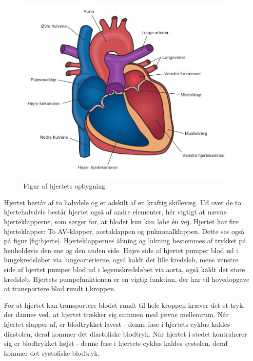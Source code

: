 \begin{figure}[h!]
	\centering
	\includegraphics[width=0.5\linewidth]{Teori/Fysiologi/hjerte}
	\caption{Figur af hjertets opbygning \cite{Hjerte}}
	\label{fig:hjerte}
\end{figure}

Hjertet består af to halvdele og er adskilt af en kraftig skillevæg. Ud over de to hjertehalvdele
består hjertet også af andre elementer, hér vigtigt at nævne hjerteklapperne, som sørger for,
at blodet kun kan løbe én vej. Hjertet har fire hjerteklapper: To AV-klapper, aortaklappen og
pulmonalklappen. Dette ses også på figur \vref{fig:hjerte}. Hjerteklappernes åbning og lukning bestemmes af trykket på henholdsvis den ene og den anden side. Højre side af hjertet pumper blod ud i lungekredsløbet via lungearterierne, også kaldt det lille kredsløb, mens venstre side af hjertet pumper blod ud i legemskredsløbet via aorta, også kaldt det store kredsløb. Hjertets pumpefunktionen er en vigtig funktion, der har til hovedopgave at transportere blod rundt i kroppen.

For at hjertet kan transportere blodet rundt til hele kroppen kræver det et tryk, der dannes
ved, at hjertet trækker sig sammen med jævne mellemrum. Når hjertet slapper af, er blodtrykket
lavest - denne fase i hjertets cyklus kaldes diastolen, deraf kommer det diastoliske blodtryk. Når
hjertet i stedet kontraherer sig er blodtrykket højst - denne fase i hjertets cyklus kaldes systolen,
deraf kommer det systoliske blodtryk. 

\clearpage

